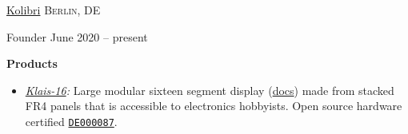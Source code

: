 \headedsection  %
  {\href{http://openkolibri.com}{Kolibri}}
  {\textsc{Berlin, DE}} {
  \headedsubsection
    {Founder}
    {June 2020 -- present}
    {

    \textbf{Products}
    \begin{itemize}
      \renewcommand\labelitemi{--}
      \item \emph{\href{https://openkolibri.com/seg/16/}{Klais-16}:}
        Large modular sixteen segment display (\href{https://github.com/openKolibri/klais-16}{docs}) made from stacked FR4 panels that is accessible to electronics hobbyists. Open source hardware certified \href{https://certification.oshwa.org/de000087.html}{\texttt{DE000087}}.
      \end{itemize}
    }
}

